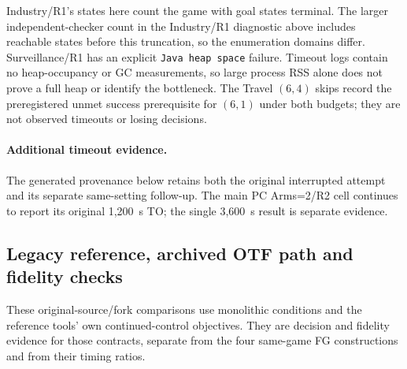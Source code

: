 \documentclass[11pt]{article}
\begin{document}
Industry/R1's \ExtIndustryDFStates{} states here count the game with goal states terminal. The larger independent-checker count in the Industry/R1 diagnostic above includes reachable states before this truncation, so the enumeration domains differ. Surveillance/R1 has an explicit \texttt{Java heap space} failure. Timeout logs contain no heap-occupancy or GC measurements, so large process RSS alone does not prove a full heap or identify the bottleneck. The \ExtBudgetSkipped{} Travel $(6,4)$ skips record the preregistered unmet success prerequisite for $(6,1)$ under both budgets; they are not observed timeouts or losing decisions.

\paragraph{Additional timeout evidence.}
The generated provenance below retains both the original interrupted attempt and its separate same-setting follow-up. The main PC Arms=2/R2 cell continues to report its original 1,200~s TO; the single 3,600~s result is separate evidence.



\clearpage


\clearpage
\subsection{Legacy reference, archived OTF path and fidelity checks}
\label{supp:legacy-reference}
These original-source/fork comparisons use monolithic conditions and the reference tools' own continued-control objectives. They are decision and fidelity evidence for those contracts, separate from the four same-game FG constructions and from their timing ratios.
\end{document}
